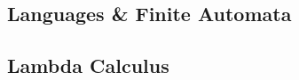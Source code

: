 \documentclass{article}
\begin{document}
  \begin{multicols}{2}
  \subsection*{Languages \& Finite Automata}
  
  
  
  
  
  
  
  
  
  
  
  \subsection*{Lambda Calculus}
  
  
  \end{multicols}
\end{document}

